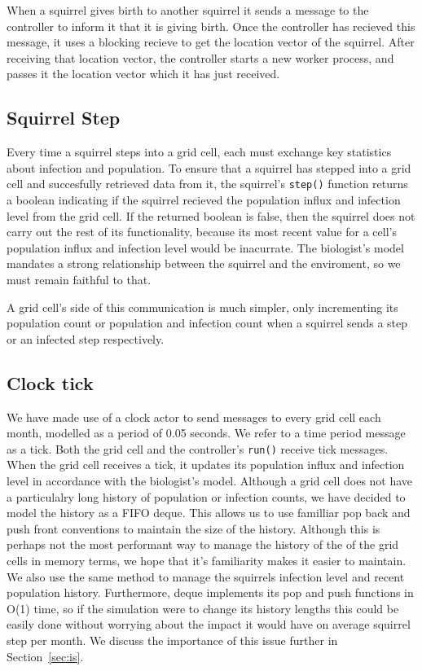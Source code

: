\documentclass[oneside]{article}
\begin{document}
When a squirrel gives birth to another squirrel it sends a message to the controller to inform it that it is giving birth. Once the controller has recieved this message, it uses a blocking recieve to get the location vector of the squirrel. After receiving that location vector, the controller starts a new worker process, and passes it the location vector which it has just received.
\subsection{Squirrel Step}
Every time a squirrel steps into a grid cell, each must exchange key statistics about infection and population. To ensure that a squirrel has stepped into a grid cell and succesfully retrieved data from it, the squirrel's \texttt{step()} function returns a boolean indicating if the squirrel recieved the population influx and infection level from the grid cell. If the returned boolean is false, then the squirrel does not carry out the rest of its functionality, because its most recent value for a cell's population influx and infection level would be inacurrate. The biologist's model mandates a strong relationship between the squirrel and the enviroment, so we must remain faithful to that.

A grid cell's side of this communication is much simpler, only incrementing its population count or population and infection count when a squirrel sends a step or an infected step respectively.
\subsection{Clock tick}
We have made use of a clock actor to send messages to every grid cell each month, modelled as a period of 0.05 seconds. We refer to a time period message as a tick. Both the grid cell and the controller's \texttt{run()} receive tick messages. When the grid cell receives a tick, it updates its population influx and infection level in accordance with the biologist's model. Although a grid cell does not have a particulalry long history of population or infection counts, we have decided to model the history as a FIFO deque. This allows us to use familliar pop back and push front conventions to maintain the size of the history. Although this is perhaps not the most performant way to manage the history of the of the grid cells in memory terms, we hope that it's familiarity makes it easier to maintain. We also use the same method to manage the squirrels infection level and recent population history. Furthermore, deque implements its pop and push functions in O(1) time, so if the simulation were to change its history lengths this could be easily done without worrying about the impact it would have on average squirrel step per month. We discuss the importance of this issue further in Section~\ref{sec:is}.
\end{document}
